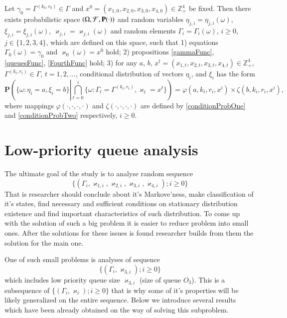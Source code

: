 \documentclass[10pt]{article}
\renewcommand{\Pr}{{\mathbf P}}
\begin{document}
\begin{thm}\label{thm1}
Let $\gamma_0=\Gamma^{(k_0,r_0)}\in \Gamma$ and $x^0=(x_{1,0},x_{2,0}, x_{3,0},x_{4,0})\in \mathbb{Z}_+^4$ be fixed.
Then there exists probabilistic space $(\Omega, {\cal F}, \Pr(\cdot))$ and random variables $\eta_{j,i}=\eta_{j,i}(\omega)$, $\xi_{j,i}=\xi_{j,i}(\omega)$, 	 $\varkappa_{j,i}=\varkappa_{j,i}(\omega)$ and random elements $\Gamma_i=\Gamma_i(\omega)$, $i\geqslant 0$, $j\in \{1, 2, 3, 4\}$, which are defined on this space, such that 1) equations $\Gamma_0(\omega) = \gamma_0$ and $\varkappa_0(\omega)=x^0$ hold; 2) propositions \eqref{gammaFunc}, \eqref{queuesFunc}, \eqref{FourthFunc} hold; 3) for any  $a$, $b$, $x^t=(x_{1,t},x_{2,t},x_{3,t},x_{4,t}) \in \mathbb{Z}_+^4$, $\Gamma^{(k_t,r_t)} \in \Gamma$, $t = 1, 2, \ldots$, conditional distribution of vectors  $\eta_i$, and $\xi_i$ has the form
\begin{equation}
\Pr \left(\{ \omega \colon \eta_i = a, \xi_i=b\} \left|\bigcap_{t=0}^{i}\{\omega\colon \Gamma_t=\Gamma^{(k_t,r_t)}, \varkappa_t=x^t\}\right.\right)=
\varphi(a,k_i,r_i,x^i)\times \zeta(b,k_i,r_i,x^i),
\label{ProbablititiesToProve}
\end{equation}
where mappings $\varphi(\cdot, \cdot, \cdot, \cdot)$ and $\zeta(\cdot, \cdot, \cdot, \cdot)$ are defined by \eqref{conditionProbOne} and \eqref{conditionProbTwo} respectively, $i \geqslant 0$.
\label{myTheorem}
\end{thm}

\section{Low-priority queue analysis}
The ultimate goal of the study is to analyse random sequence
\begin{equation}
\{(\Gamma_i, \varkappa_{1, i}, \varkappa_{2, i}, \varkappa_{3, i}, \varkappa_{4, i}); i \geqslant 0\}
\end{equation}
That is researcher should conclude about it's Markove'ness, make classification of it's states, find necessary and sufficient conditions on stationary distribution existence and find important characteristics of such distribution. To come up with the solution of such a big problem it is easier to reduce problem into small ones. After the solutions for these issues is found researcher builds from them the solution for the main one.

One of such small problems is analyses of sequence
\begin{equation}
\{(\Gamma_i, \varkappa_{3, i}); i \geqslant 0\}
\end{equation}
which includes low priority queue size $\varkappa_{3, i}$ (size of queue $O_3$). This is a subsequence of $\{(\Gamma_i, \varkappa_{i}); i \geqslant 0\}$ that is why some of it's properties will be likely generalized on the entire sequence. Below we introduce several results which have been already obtained on the way of solving this subproblem.
\end{document}
